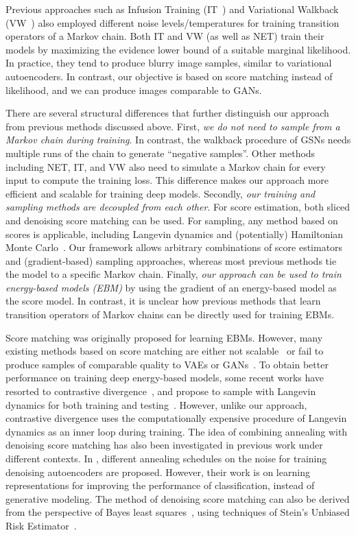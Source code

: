 \documentclass{article}
\begin{document}
Previous approaches such as Infusion Training (IT~\cite{bordes2017learning}) and Variational Walkback (VW~\cite{goyal2017variational}) also employed different noise levels/temperatures 
for training transition operators of a Markov chain. Both IT and VW (as well as NET) train their models by maximizing the evidence lower bound of a suitable marginal likelihood.   
In practice, they tend to produce blurry image samples, similar to variational autoencoders. In contrast, our objective is based on score matching instead of likelihood, and we can produce images comparable to GANs.

There are several structural differences that further distinguish our approach from previous methods discussed above. First, \emph{we do not need to sample from a Markov chain during training}. In contrast, the walkback procedure of GSNs needs multiple runs of the chain to generate ``negative samples''. Other methods including NET, IT, and VW also need to simulate a Markov chain for every input to compute the training loss. This difference makes our approach more efficient and scalable for training deep models. Secondly, \emph{our training and sampling methods are decoupled from each other}. For score estimation, both sliced and denoising score matching can be used. For sampling, any method based on scores is applicable, including Langevin dynamics and (potentially) Hamiltonian Monte Carlo~\cite{neal2012mcmc}. Our framework allows arbitrary combinations of score estimators and (gradient-based) sampling approaches, whereas most previous methods tie the model to a specific Markov chain. Finally, \emph{our approach can be used to train energy-based models (EBM)} by using the gradient of an energy-based model as the score model. In contrast, it is unclear how previous methods that learn transition operators of Markov chains can be directly used for training EBMs.

Score matching was originally proposed for learning EBMs. However, many existing methods based on score matching are either not scalable~\cite{hyvarinen2005estimation} or fail to produce samples of comparable quality to VAEs or GANs~\cite{kingma2010regularized,saremi2018deep}. To obtain better performance on training deep energy-based models, some recent works have resorted to contrastive divergence~\cite{hinton2002training}, and propose to sample with Langevin dynamics for both training and testing~\cite{du2019implicit,nijkamp2019anatomy}. However, unlike our approach, contrastive divergence uses the computationally expensive procedure of Langevin dynamics as an inner loop during training. The idea of combining annealing with denoising score matching has also been investigated in previous work under different contexts. In \cite{geras2014scheduled,chandra2014adaptive,zhang2018convolutional}, different annealing schedules on the noise for training denoising autoencoders are proposed. However, their work is on learning representations for improving the performance of classification, instead of generative modeling. The method of denoising score matching can also be derived from the perspective of Bayes least squares~\cite{raphan2007learning,raphan2011least}, using techniques of Stein's Unbiased Risk Estimator~\cite{miyasawa1961empirical,stein1981estimation}.
\end{document}
